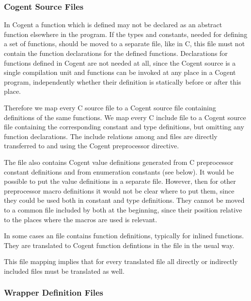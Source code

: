 \subsubsection{Cogent Source Files}

In Cogent a function which is defined may not be declared as an abstract function elsewhere in the program. If the types and constants,
needed for defining a set of functions, should be moved to a separate file, like in C, this file must not contain the 
function declarations for the defined functions. Declarations for functions defined in Cogent are not needed at all, since the Cogent 
source is a single compilation unit and functions can be invoked at any place in a Cogent program, independently whether their definition 
is statically before or after this place.

Therefore we map every C source file  to a Cogent source file  containing definitions of the same 
functions. We map every C include file  to a Cogent source file  
containing the corresponding constant and type definitions, but omitting any function declarations. The include relations among 
 and  files are directly transferred to  and  using the Cogent preprocessor 
 directive. 

The file  also contains Cogent value definitions generated from C preprocessor
constant definitions and from enumeration constants (see below). It would be possible to put the value definitions in a 
separate file. However, then for other preprocessor macro definitions it would not be clear where to put them, since they could
be used both in constant and type definitions. They cannot be moved to a common file included by both at the beginning,
since their position relative to the places where the macros are used is relevant.

In some cases an  file contains function definitions, typically for inlined functions. They are translated to Cogent
function defintions in the  file in the usual way.

This file mapping implies that for every translated  file all directly or indirectly included  files must be 
translated as well.

\subsubsection{Wrapper Definition Files}

